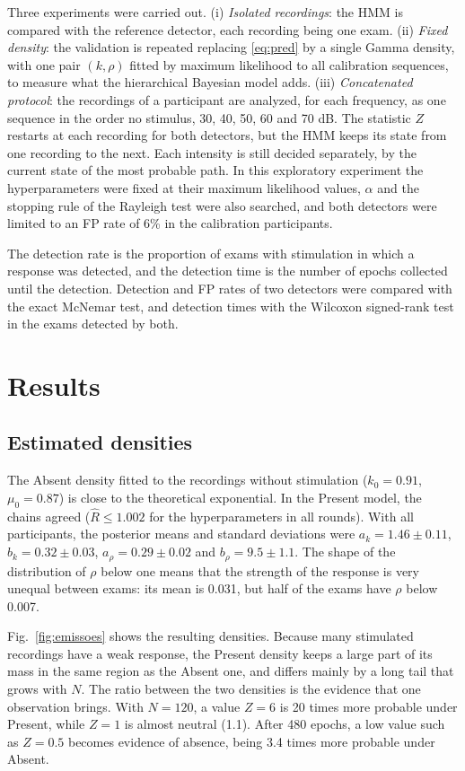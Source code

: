\documentclass[conference]{IEEEtran}
\begin{document}
Three experiments were carried out. (i) \textit{Isolated recordings}: the HMM is compared with the reference detector, each recording being one exam. (ii) \textit{Fixed density}: the validation is repeated replacing \eqref{eq:pred} by a single Gamma density, with one pair $(k,\rho)$ fitted by maximum likelihood to all calibration sequences, to measure what the hierarchical Bayesian model adds. (iii) \textit{Concatenated protocol}: the recordings of a participant are analyzed, for each frequency, as one sequence in the order no stimulus, 30, 40, 50, 60 and 70 dB. The statistic $Z$ restarts at each recording for both detectors, but the HMM keeps its state from one recording to the next. Each intensity is still decided separately, by the current state of the most probable path. In this exploratory experiment the hyperparameters were fixed at their maximum likelihood values, $\alpha$ and the stopping rule of the Rayleigh test were also searched, and both detectors were limited to an FP rate of 6\% in the calibration participants.

The detection rate is the proportion of exams with stimulation in which a response was detected, and the detection time is the number of epochs collected until the detection. Detection and FP rates of two detectors were compared with the exact McNemar test, and detection times with the Wilcoxon signed-rank test in the exams detected by both.

\section{Results}

\subsection{Estimated densities}

The Absent density fitted to the recordings without stimulation ($k_0=0.91$, $\mu_0=0.87$) is close to the theoretical exponential. In the Present model, the chains agreed ($\hat{R}\le1.002$ for the hyperparameters in all rounds). With all participants, the posterior means and standard deviations were $a_k=1.46\pm0.11$, $b_k=0.32\pm0.03$, $a_\rho=0.29\pm0.02$ and $b_\rho=9.5\pm1.1$. The shape of the distribution of $\rho$ below one means that the strength of the response is very unequal between exams: its mean is 0.031, but half of the exams have $\rho$ below 0.007.

Fig.~\ref{fig:emissoes} shows the resulting densities. Because many stimulated recordings have a weak response, the Present density keeps a large part of its mass in the same region as the Absent one, and differs mainly by a long tail that grows with $N$. The ratio between the two densities is the evidence that one observation brings. With $N=120$, a value $Z=6$ is 20 times more probable under Present, while $Z=1$ is almost neutral (1.1). After 480 epochs, a low value such as $Z=0.5$ becomes evidence of absence, being 3.4 times more probable under Absent.
\end{document}
